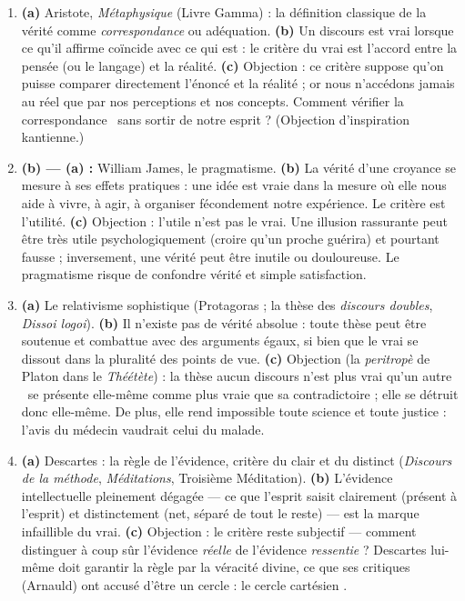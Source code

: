 \documentclass[11pt]{article}
\begin{document}
\begin{corrige}
\begin{enumerate}
\item \textbf{(a)} Aristote, \emph{Métaphysique} (Livre Gamma) : la définition classique de la vérité comme \emph{correspondance} ou adéquation. \textbf{(b)} Un discours est vrai lorsque ce qu'il affirme coïncide avec ce qui est : le critère du vrai est l'accord entre la pensée (ou le langage) et la réalité. \textbf{(c)} Objection : ce critère suppose qu'on puisse comparer directement l'énoncé et la réalité ; or nous n'accédons jamais au réel que par nos perceptions et nos concepts. Comment vérifier la \guillemotleft correspondance \guillemotright\ sans sortir de notre esprit ? (Objection d'inspiration kantienne.)
\item \textbf{(b) — (a) :} William James, le pragmatisme. \textbf{(b)} La vérité d'une croyance se mesure à ses effets pratiques : une idée est vraie dans la mesure où elle nous aide à vivre, à agir, à organiser fécondement notre expérience. Le critère est l'utilité. \textbf{(c)} Objection : l'utile n'est pas le vrai. Une illusion rassurante peut être très utile psychologiquement (croire qu'un proche guérira) et pourtant fausse ; inversement, une vérité peut être inutile ou douloureuse. Le pragmatisme risque de confondre vérité et simple satisfaction.
\item \textbf{(a)} Le relativisme sophistique (Protagoras ; la thèse des \emph{discours doubles}, \emph{Dissoi logoi}). \textbf{(b)} Il n'existe pas de vérité absolue : toute thèse peut être soutenue et combattue avec des arguments égaux, si bien que le vrai se dissout dans la pluralité des points de vue. \textbf{(c)} Objection (la \emph{peritropè} de Platon dans le \emph{Théétète}) : la thèse \guillemotleft aucun discours n'est plus vrai qu'un autre \guillemotright\ se présente elle-même comme plus vraie que sa contradictoire ; elle se détruit donc elle-même. De plus, elle rend impossible toute science et toute justice : l'avis du médecin vaudrait celui du malade.
\item \textbf{(a)} Descartes : la règle de l'évidence, critère du clair et du distinct (\emph{Discours de la méthode}, \emph{Méditations}, Troisième Méditation). \textbf{(b)} L'évidence intellectuelle pleinement dégagée — ce que l'esprit saisit clairement (présent à l'esprit) et distinctement (net, séparé de tout le reste) — est la marque infaillible du vrai. \textbf{(c)} Objection : le critère reste subjectif — comment distinguer à coup sûr l'évidence \emph{réelle} de l'évidence \emph{ressentie} ? Descartes lui-même doit garantir la règle par la véracité divine, ce que ses critiques (Arnauld) ont accusé d'être un cercle : le \guillemotleft cercle cartésien \guillemotright.
\end{enumerate}
\end{corrige}
\end{document}
